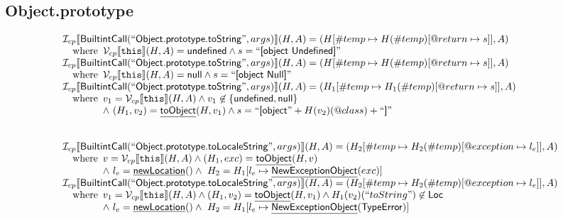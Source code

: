 \documentclass{article}
\makeatletter
\newcommand{\SF}[1]{\mbox{\textsf{#1}}}
\newcommand{\TT}[1]{\mbox{\texttt{#1}}}
\newcommand{\wherec}[1]{{\rm where}\begin{array}[t]{l}#1\end{array}}
\newcommand{\Loc}{\SF{Loc}}
\newcommand{\I}{\mathcal{I}}
\newcommand{\V}{\mathcal{V}}
\newcommand{\lbr}{\llbracket}
\newcommand{\rbr}{\rrbracket}
\newcommand{\hf}[1]{\underline{\sf #1}}
\newcommand{\varloc}[1]{\##1}
\newcommand{\varprop}[1]{@#1}
\makeatother
\begin{document}
\subsection{Object.prototype}
\[
\begin{array}{l}
\I _{cp}\lbr \SF{BuiltintCall}(``\SF{Object.prototype.toString}",args)\rbr(H,A)
 = (H[\varloc{temp}\mapsto H(\varloc{temp})[\varprop{return}\mapsto s]], A) \\
\quad\wherec{
  \V _{cp}\lbr \TT{this}\rbr (H,A) = \SF{undefined} \land s =  ``\SF{[object Undefined]}"
  }\\
  
\I _{cp}\lbr \SF{BuiltintCall}(``\SF{Object.prototype.toString}",args)\rbr(H,A)
 = (H[\varloc{temp}\mapsto H(\varloc{temp})[\varprop{return}\mapsto s]], A) \\
\quad\wherec{
  \V _{cp}\lbr \TT{this}\rbr (H,A) = \SF{null} \land s =  ``\SF{[object Null]}"
  }\\
  
\I _{cp}\lbr \SF{BuiltintCall}(``\SF{Object.prototype.toString}",args)\rbr(H,A)
 = (H_1[\varloc{temp}\mapsto H_1(\varloc{temp})[\varprop{return}\mapsto s]], A) \\
\quad\wherec{
  v_1 = \V _{cp}\lbr \TT{this}\rbr (H,A) \land  v_1 \not\in \{ \SF{undefined}, \SF{null} \}\\
  \land\ (H_1, v_2) = \hf{toObject}(H, v_1) \land s =  ``\SF{[object}" + H(v_2)(@class) + ``\SF{]}"
  }\\
\\\\



\I _{cp}\lbr \SF{BuiltintCall}(``\SF{Object.prototype.toLocaleString}",args)\rbr(H,A)
 = (H_2[\varloc{temp}\mapsto H_2(\varloc{temp})[\varprop{exception}\mapsto l_e]], A) \\
\quad\wherec{
  v = \V _{cp}\lbr \TT{this}\rbr (H,A) \land (H_1, exc) = \hf{toObject}(H, v)\\
  \land\ l_e = \hf{newLocation}() \land\ H_2=H_1[l_e\mapsto\hf{NewExceptionObject}(exc)] 
  }\\
  
\I _{cp}\lbr \SF{BuiltintCall}(``\SF{Object.prototype.toLocaleString}",args)\rbr(H,A)
 = (H_2[\varloc{temp}\mapsto H_2(\varloc{temp})[\varprop{exception}\mapsto l_e]], A) \\
\quad\wherec{
  v_1 = \V _{cp}\lbr \TT{this}\rbr (H,A) \land (H_1, v_2) = \hf{toObject}(H, v_1) \land H_1(v_2)(``toString") \not\in \Loc\\
  \land\ l_e = \hf{newLocation}() \land\ H_2=H_1[l_e\mapsto\hf{NewExceptionObject}(\SF{TypeError})]
  }\\
  

\end{array}\]
\end{document}
